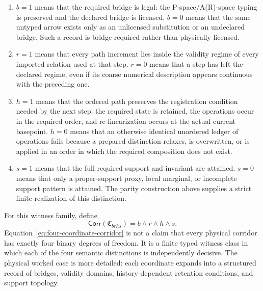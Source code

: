 \documentclass[11pt]{article}
\theoremstyle{definition}
\begin{document}
\begin{enumerate}
\item $b=1$ means that the required bridge is legal: the P-space/A(R)-space
typing is preserved and the declared bridge is licensed. $b=0$ means that the
same untyped arrow exists only as an unlicensed substitution or an undeclared
bridge. Such a record is bridge-required rather than physically licensed.

\item $r=1$ means that every path increment lies inside the validity regime
of every imported relation used at that step. $r=0$ means that a step has left
the declared regime, even if its coarse numerical description appears continuous
with the preceding one.

\item $h=1$ means that the ordered path preserves the registration condition
needed by the next step: the required state is retained, the operations occur in
the required order, and re-linearization occurs at the actual current basepoint.
$h=0$ means that an otherwise identical unordered ledger of operations fails
because a prepared distinction relaxes, is overwritten, or is applied in an order
in which the required composition does not exist.

\item $s=1$ means that the full required support and invariant are attained.
$s=0$ means that only a proper-support proxy, local marginal, or incomplete
support pattern is attained. The parity construction above supplies a strict
finite realization of this distinction.
\end{enumerate}

For this witness family, define
\begin{equation}
\mathsf{Corr}(\mathfrak C_{brhs})=b\wedge r\wedge h\wedge s.
\label{eq:four-coordinate-corridor}
\end{equation}
Equation~\eqref{eq:four-coordinate-corridor} is not a claim that every physical
corridor has exactly four binary degrees of freedom. It is a finite typed witness
class in which each of the four semantic distinctions is independently decisive.
The physical worked case is more detailed: each coordinate expands into a
structured record of bridges, validity domains, history-dependent retention
conditions, and support topology.
\end{document}
